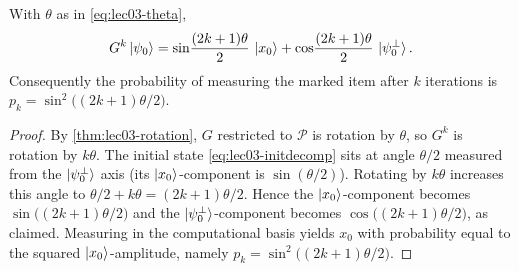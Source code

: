 \begin{theorem}
\label{thm:lec03-afterk}
With $\theta$ as in \eqref{eq:lec03-theta},
\[
  G^{k}\ket{\psi_0}
    =\sin\!\frac{(2k+1)\theta}{2}\,\ket{x_0}
     +\cos\!\frac{(2k+1)\theta}{2}\,\ket{\psi_0^{\perp}}.
\]
Consequently the probability of measuring the marked item after $k$ iterations is
$p_k=\sin^{2}\!\bigl((2k+1)\theta/2\bigr)$.
\end{theorem}

\begin{proof}
By \cref{thm:lec03-rotation}, $G$ restricted to $\mathcal P$ is rotation by
$\theta$, so $G^{k}$ is rotation by $k\theta$. The initial state
\eqref{eq:lec03-initdecomp} sits at angle $\theta/2$ measured from the
$\ket{\psi_0^{\perp}}$ axis (its $\ket{x_0}$-component is $\sin(\theta/2)$).
Rotating by $k\theta$ increases this angle to $\theta/2+k\theta=(2k+1)\theta/2$.
Hence the $\ket{x_0}$-component becomes $\sin\bigl((2k+1)\theta/2\bigr)$ and the
$\ket{\psi_0^{\perp}}$-component becomes $\cos\bigl((2k+1)\theta/2\bigr)$, as
claimed. Measuring in the computational basis yields $x_0$ with probability equal
to the squared $\ket{x_0}$-amplitude, namely
$p_k=\sin^{2}\bigl((2k+1)\theta/2\bigr)$.
\end{proof}

